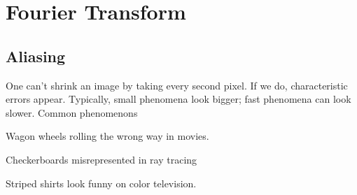 \chapter{Fourier Transform}
\section{Aliasing}
One can't shrink an image by taking every second pixel. If we do, characteristic errors appear. Typically, small phenomena look bigger; fast phenomena can look slower. Common phenomenons
\begin{enumerate*}[label=\protect\circled{\arabic*},itemjoin=]
	\item Wagon wheels rolling the wrong way in movies.\\
	\item Checkerboards misrepresented in ray tracing\\
	\item Striped shirts look funny on color television.\\
\end{enumerate*}
